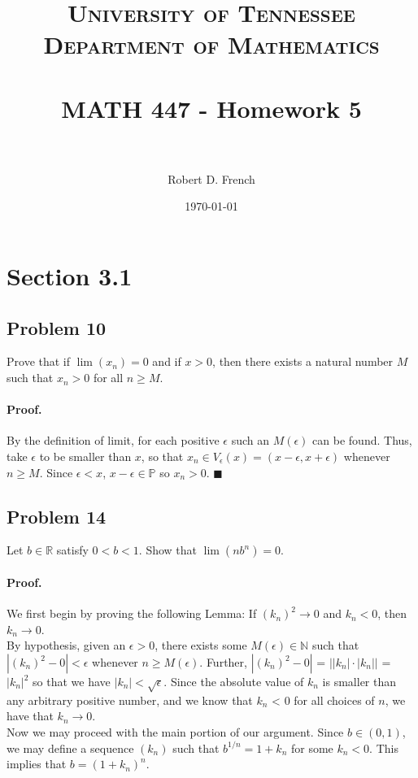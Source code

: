 \documentclass[paper=a4, fontsize=11pt]{scrartcl} %
\title{	
\normalfont \normalsize 
\textsc{University of Tennessee \\ Department of Mathematics} \\ [25pt] %
\horrule{0.5pt} \\[0.4cm] %
\huge MATH 447 - Homework 5 \\ %
\horrule{2pt} \\[0.5cm] %
}
\author{Robert D. French} %
\date{\normalsize\today} %
\numberwithin{equation}{section} %
\numberwithin{figure}{section} %
\numberwithin{table}{section} %
\begin{document}
\maketitle %


\section*{Section 3.1}

\newcommand{\prob}[1]{\subsection*{Problem {#1}}}
\newcommand{\subprob}[1]{\subsubsection*{{#1}}}
\newcommand{\pf}{\paragraph{Proof.}}

\prob{10} Prove that if $\lim(x_n) = 0$ and if $x > 0$, then there exists a natural number $M$ such that $x_n > 0$ for all $n \geq M$.

\pf By the definition of limit, for each positive $\epsilon$ such an $M(\epsilon)$ can be found. Thus, take $\epsilon$ to be smaller than $x$, so that $x_n \in V_\epsilon (x) = (x - \epsilon, x + \epsilon)$ whenever $n \geq M$. Since $\epsilon < x$, $x - \epsilon \in \mathbb{P}$ so $x_n > 0$. $\blacksquare$

\prob{14} Let $b \in \mathbb{R}$ satisfy $0 < b < 1$. Show that $\lim(nb^n) = 0$.

\pf We first begin by proving the following Lemma: If $(k_n)^2 \rightarrow 0$ and $k_n < 0$, then $k_n \rightarrow 0$.\\

By hypothesis, given an $\epsilon > 0$, there exists some $M(\epsilon) \in \mathbb{N}$ such that  $|(k_n)^2 - 0| < \epsilon$ whenever $n \geq M(\epsilon)$. Further, $|(k_n)^2 - 0|$ = $\left| \left| k_n \right| \cdot \left| k_n \right| \right|$ = $|k_n|^2$ so that we have $|k_n| < \sqrt{\epsilon}$. Since the absolute value of $k_n$ is smaller than any arbitrary positive number, and we know that $k_n$ < 0 for all choices of $n$, we have that $k_n \rightarrow 0$.\\

Now we may proceed with the main portion of our argument. Since $b \in (0,1)$, we may define a sequence $(k_n)$ such that $b^{1/n} = 1 + k_n$ for some $k_n < 0$. This implies that $b = (1 + k_n)^n$.\\
\end{document}
